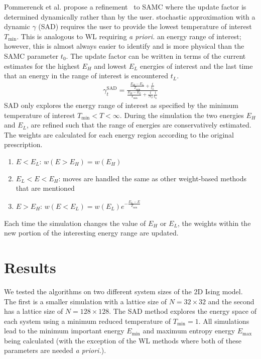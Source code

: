 \documentclass[letterpaper,twocolumn,amsmath,amssymb,pre,aps,10pt]{revtex4-1}
\begin{document}
Pommerenck et al. propose a refinement~\cite{pommerenck2020stochastic} to SAMC
where the update factor is determined dynamically rather than by the user.
stochastic approximation with a dynamic $\gamma$ (SAD) requires the user to
provide the lowest temperature of interest $T_{\min}$. This is analogous to WL
requiring \emph{a priori.} an energy range of interest; however, this is almost always easier to
identify and is more physical than the SAMC parameter $t_0$. The update factor
can be written in terms of the current estimates for the highest $E_H$ and
lowest $E_L$ energies of interest and the last time that an energy in the range
of interest is encountered $t_L$.
\begin{align}
  \gamma_{t}^{\text{SAD}} =
     \frac{
       \frac{E_{H}-E_{L}}{T_{\text{min}}} + \frac{t}{t_L}
     }{
       \frac{E_{H}-E_{L}}{T_{\text{min}}} + \frac{t}{N_S}\frac{t}{t_L}
     }
\end{align}
SAD only explores the energy range of interest as specified by the minimum
temperature of interest $T_{\min} < T < \infty$. During the simulation the two
energies $E_H$ and $E_L$, are refined such that the range of energies are conservatively
estimated. The weights are calculated for each energy region according to the original
prescription.
\begin{enumerate}
\item {$E < E_L$:} $w(E>E_H) = w(E_H)$
\item {$E_L < E < E_H$:} moves are handled the same as other weight-based
methods that are mentioned
\item {$E > E_H$:} $w(E<E_L) = w(E_L)e^{-\frac{E_L-E}{T_{\min}}}$
\end{enumerate}
Each time the simulation changes the value of $E_H$ or $E_L$, the weights
within the new portion of the interesting energy range are updated.

\section{Results}
We tested the algorithms on two different system sizes of the 2D Ising model.  The first is a smaller
simulation with a lattice size of $N = 32 \times 32$ and the second has a lattice size of $N = 128 \times 128$. The SAD method explores the energy
space of each system using a minimum reduced temperature of $T_{\text{min}} = 1$. All simulations lead to the minimum important energy $E_{\min}$
and maximum entropy energy $E_{\max}$ being calculated (with the exception of
the WL methods where both of these parameters are needed \emph{a priori.}).
\end{document}
